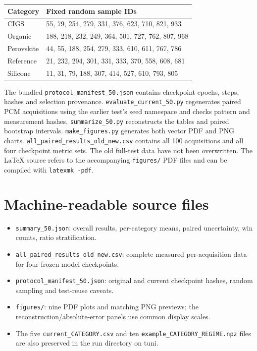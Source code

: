 \documentclass[11pt,a4paper]{article}
\begin{document}
\begin{longtable}{lp{.74\linewidth}}\toprule Category & Fixed random sample IDs \\ \midrule\endhead
CIGS & 55, 79, 254, 279, 331, 376, 623, 710, 821, 933 \\
Organic & 188, 218, 232, 249, 364, 501, 727, 762, 807, 968 \\
Perovskite & 44, 55, 188, 254, 279, 333, 610, 611, 767, 786 \\
Reference & 21, 232, 294, 301, 331, 333, 370, 558, 608, 681 \\
Silicone & 11, 31, 79, 188, 307, 414, 527, 610, 793, 805 \\
\bottomrule\end{longtable}
The bundled \texttt{protocol\_manifest\_50.json} contains checkpoint epochs, steps, hashes and selection provenance. \texttt{evaluate\_current\_50.py} regenerates paired PCM acquisitions using the earlier test's seed namespace and checks pattern and measurement hashes. \texttt{summarize\_50.py} reconstructs the tables and paired bootstrap intervals. \texttt{make\_figures.py} generates both vector PDF and PNG charts. \texttt{all\_paired\_results\_old\_new.csv} contains all 100 acquisitions and all four checkpoint metric sets. The old full-test data have not been overwritten. The LaTeX source refers to the accompanying \texttt{figures/} PDF files and can be compiled with \texttt{latexmk -pdf}.
\section{Machine-readable source files}
\begin{itemize}[leftmargin=*]
\item \texttt{summary\_50.json}: overall results, per-category means, paired uncertainty, win counts, ratio stratification.
\item \texttt{all\_paired\_results\_old\_new.csv}: complete measured per-acquisition data for four frozen model checkpoints.
\item \texttt{protocol\_manifest\_50.json}: original and current checkpoint hashes, random sampling and test-reuse caveats.
\item \texttt{figures/}: nine PDF plots and matching PNG previews; the reconstruction/absolute-error panels use common display scales.
\item The five \texttt{current\_CATEGORY.csv} and ten \texttt{example\_CATEGORY\_REGIME.npz} files are also preserved in the run directory on tuni.
\end{itemize}
\end{document}
